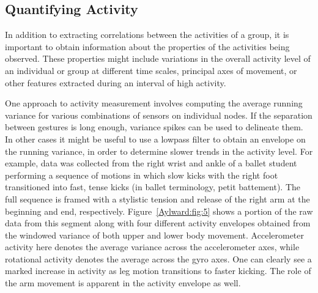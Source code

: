 \subsection{Quantifying Activity}


In addition to extracting correlations between the activities of a group, it is
important to obtain information about the properties of the activities being
observed. These properties might include variations in the overall activity level
of an individual or group at different time scales, principal axes of movement,
or other features extracted during an interval of high activity.

One approach to activity measurement involves computing the average running
variance for various combinations of sensors on individual nodes. If the
separation between gestures is long enough, variance spikes can be used to
delineate them.  In other cases it might be useful to use a lowpass filter to
obtain an envelope on the running variance, in order to determine slower trends
in the activity level. For example, data was collected from the right wrist and
ankle of a ballet student performing a sequence of motions in which slow kicks
with the right foot transitioned into fast, tense kicks (in ballet terminology,
petit battement). The full sequence is framed with a stylistic tension and
release of the right arm at the beginning and end, respectively.  Figure~\ref{Aylward:fig:5} shows
a portion of the raw data from this segment along with four different activity
envelopes obtained from the windowed variance of both upper and lower body
movement. Accelerometer activity here denotes the average variance across the
accelerometer axes, while rotational activity denotes the average across the gyro
axes. One can clearly see a marked increase in activity as leg motion transitions
to faster kicking. The role of the arm movement is apparent in the activity
envelope as well.

